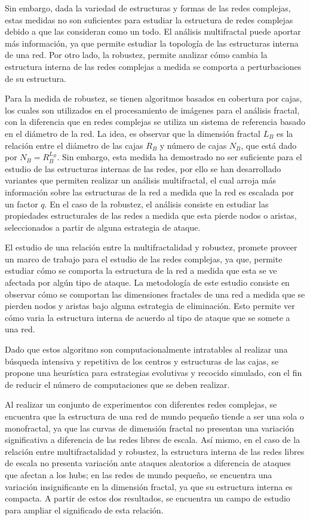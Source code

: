 Sin embargo, dada la variedad de estructuras y formas de las redes complejas, estas medidas no son suficientes para estudiar la estructura de redes complejas debido a que las consideran como un todo\cite{Song2005}. El análisis multifractal puede aportar más información\cite{Li2014}, ya que permite estudiar la topología de las estructuras interna de una red. Por otro lado, la robustez\cite{Schneider2011}, permite analizar cómo cambia la estructura interna de las redes complejas a medida se comporta a perturbaciones de su estructura.

Para la medida de robustez, se tienen algoritmos basados en cobertura por cajas\cite{Song2007}, los cuales son utilizados en el procesamiento de imágenes para el análisis fractal, con la diferencia que en redes complejas se utiliza un sistema de referencia basado en el diámetro de la red. La idea, es observar que la dimensión fractal $L_B$ es la relación entre el diámetro de las cajas $R_B$ y número de cajas $N_B$, que está dado por $N_B=R_{B}^{L_B}$. Sin embargo, esta medida ha demostrado no ser suficiente para el estudio de las estructuras internas de las redes\cite{Wang2012}, por ello se han desarrollado variantes que permiten realizar un análisis multifractal, el cual arroja más información sobre las estructuras de la red a medida que la red es escalada por un factor $q$. En el caso de la robustez, el análisis consiste en estudiar las propiedades estructurales de las redes a medida que esta pierde nodos o aristas, seleccionados a partir de alguna estrategia de ataque.

El estudio de una relación entre la multifractalidad y robustez, promete proveer un marco de trabajo para el estudio de las redes complejas, ya que, permite estudiar cómo se comporta la estructura de la red a medida que esta se ve afectada por algún tipo de ataque. La metodología de este estudio consiste en observar cómo se comportan las dimensiones fractales de una red a medida que se pierden nodos y aristas bajo alguna estrategia de eliminación. Esto permite ver cómo varia la estructura interna de acuerdo al tipo de ataque que se somete a una red.

Dado que estos algoritmo son computacionalmente intratables al realizar una búsqueda intensiva y repetitiva de los centros y estructuras de las cajas, se propone una heurística para estrategias evolutivas y recocido simulado, con el fin de reducir el número de computaciones que se deben realizar.

Al realizar un conjunto de experimentos con diferentes redes complejas, se encuentra que la estructura de una red de mundo pequeño tiende a ser una sola o monofractal, ya que las curvas de dimensión fractal no presentan una variación significativa a diferencia de las redes libres de escala. Así mismo, en el caso de la relación entre multifractalidad y robustez, la estructura interna de las redes libres de escala no presenta variación ante ataques aleatorios a diferencia de ataques que afectan a los hubs; en las redes de mundo pequeño, se encuentra una variación insignificante en la dimensión fractal, ya que su estructura interna es compacta. A partir de estos dos resultados, se encuentra un campo de estudio para ampliar el significado de esta relación.


